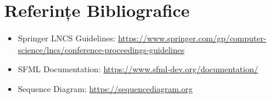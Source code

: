 \documentclass[runningheads]{llncs}
\begin{document}
\section{Referințe Bibliografice}
\begin{itemize}
    \item Springer LNCS Guidelines: \url{https://www.springer.com/gp/computer-science/lncs/conference-proceedings-guidelines}
    \item SFML Documentation: \url{https://www.sfml-dev.org/documentation/}
    \item Sequence Diagram: \url{ https://sequencediagram.org}
\end{itemize}
\end{document}
